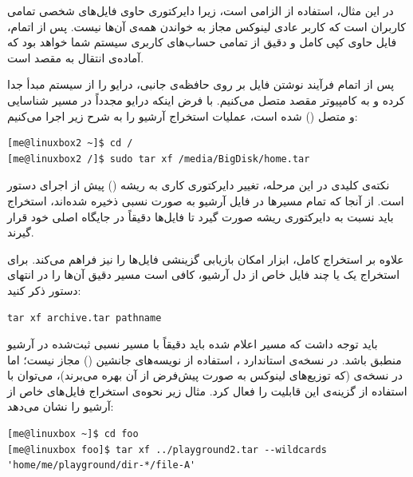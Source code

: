 در این مثال، استفاده از  الزامی است، زیرا دایرکتوری  حاوی فایل‌های شخصی تمامی کاربران است که کاربر عادی لینوکس مجاز به خواندن همه‌ی آن‌ها نیست. پس از اتمام، فایل  حاوی کپی کامل و دقیق از تمامی حساب‌های کاربری سیستم شما خواهد بود که آماده‌ی انتقال به مقصد است.

پس از اتمام فرآیند نوشتن فایل  بر روی حافظه‌ی جانبی، درایو را از سیستم مبدأ جدا کرده و به کامپیوتر مقصد متصل می‌کنیم. با فرض اینکه درایو مجدداً در مسیر  شناسایی و متصل () شده است، عملیات استخراج آرشیو را به شرح زیر اجرا می‌کنیم:

\begin{latin}
\begin{lstlisting}
[me@linuxbox2 ~]$ cd /
[me@linuxbox2 /]$ sudo tar xf /media/BigDisk/home.tar
\end{lstlisting}
\end{latin}

نکته‌ی کلیدی در این مرحله، تغییر دایرکتوری کاری به ریشه (\cmd{/}) پیش از اجرای دستور است. از آنجا که تمام مسیرها در فایل آرشیو به صورت نسبی ذخیره شده‌اند، استخراج باید نسبت به دایرکتوری ریشه صورت گیرد تا فایل‌ها دقیقاً در جایگاه اصلی خود قرار گیرند.

علاوه بر استخراج کامل، ابزار  امکان بازیابی گزینشی فایل‌ها را نیز فراهم می‌کند. برای استخراج یک یا چند فایل خاص از دل آرشیو، کافی است مسیر دقیق آن‌ها را در انتهای دستور ذکر کنید:

\begin{latin}
\begin{lstlisting}
tar xf archive.tar pathname
\end{lstlisting}
\end{latin}

باید توجه داشت که مسیر اعلام شده باید دقیقاً با مسیر نسبی ثبت‌شده در آرشیو منطبق باشد. در نسخه‌ی استاندارد ، استفاده از نویسه‌های جانشین () مجاز نیست؛ اما در نسخه‌ی  (که توزیع‌های لینوکس به صورت پیش‌فرض از آن بهره می‌برند)، می‌توان با استفاده از گزینه‌ی  این قابلیت را فعال کرد. مثال زیر نحوه‌ی استخراج فایل‌های خاص از آرشیو  را نشان می‌دهد:

\begin{latin}
\begin{lstlisting}
[me@linuxbox ~]$ cd foo
[me@linuxbox foo]$ tar xf ../playground2.tar --wildcards 'home/me/playground/dir-*/file-A'
\end{lstlisting}
\end{latin}

